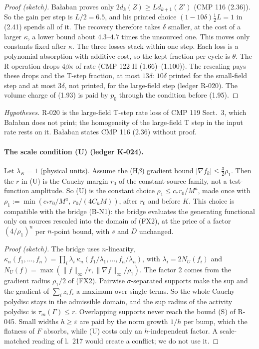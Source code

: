 \begin{proof}[Proof (sketch)]
Ba{\l}aban proves only $2d_k(Z)\ge Ld_{k+1}(Z')$ (CMP 116 (2.36)). So the gain per step is $L/2=6.5$, and his printed choice $(1-10\delta)\tfrac12L=1$ in (2.41) spends all of it. The recovery therefore takes $\delta$ smaller, at the cost of a larger $\kappa$, a lower bound about $4.3$--$4.7$ times the unsourced one. This moves only constants fixed after $\kappa$. The three losses stack within one step. Each loss is a polynomial absorption with additive cost, so the kept fraction per cycle is $\theta$. The R operation drops $4\beta\kappa$ of rate (CMP 122 II (1.66)--(1.100)). The rescaling pays these drops and the T-step fraction, at most $13\delta$: $10\delta$ printed for the small-field step and at most $3\delta$, not printed, for the large-field step (ledger R-020). The volume charge of (1.93) is paid by $p_0$ through the condition before (1.95).
\end{proof}

\emph{Hypotheses.} R-020 is the large-field T-step rate loss of CMP 119 Sect.~3, which Ba{\l}aban does not print; the homogeneity of the large-field T step in the input rate rests on it. Ba{\l}aban states CMP 116 (2.36) without proof.

\paragraph{The scale condition (U) (ledger K-024).}

\begin{proposition}\label{src:UN1}
Let $\lambda_K=1$ (physical units). Assume the (H$\beta$) gradient bound $|\nabla f_k|\le\tfrac32\rho_1$. Then the $r$ in (U) is the Cauchy margin $r_0$ of the constant-source family, not a test-function amplitude. So (U) is the constant choice $\rho_1\le c_*r_0/M^a$, made once with $\rho_1:=\min(c_*r_0/M^a,\,r_0/(4C_hM))$, after $r_0$ and before $K$. This choice is compatible with the bridge (B-N1): the bridge evaluates the generating functional only on sources rescaled into the domain of (FX2), at the price of a factor $(4/\rho_1)^n$ per $n$-point bound, with $s$ and $D$ unchanged.
\end{proposition}

\begin{proof}[Proof (sketch)]
The bridge uses $n$-linearity, $\kappa_n(f_1,\dots,f_n)=\prod_i\lambda_i\,\kappa_n(f_1/\lambda_1,\dots,f_n/\lambda_n)$, with $\lambda_i=2N_U(f_i)$ and $N_U(f)=\max(\|f\|_\infty/r,\|\nabla f\|_\infty/\rho_1)$. The factor 2 comes from the gradient radius $\rho_1/2$ of (FX2). Pairwise $\sigma$-separated supports make the sup and the gradient of $\sum_iz_if_i$ a maximum over single terms. So the whole Cauchy polydisc stays in the admissible domain, and the sup radius of the activity polydisc is $\tau_m(\Gamma)\le r$. Overlapping supports never reach the bound (S) of R-045. Small widths $h\ge\varepsilon$ are paid by the norm growth $1/h$ per bump, which the flatness of $F$ absorbs, while (U) costs only an $h$-independent factor. A scale-matched reading of  l.~217 would create a conflict; we do not use it.
\end{proof}

